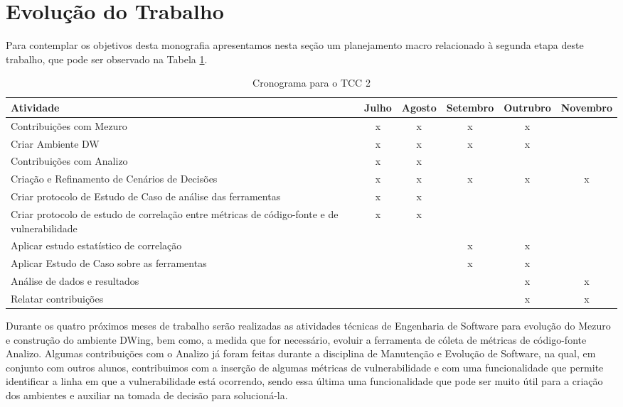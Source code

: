 
\section{Evolução do Trabalho}

%

Para contemplar os objetivos desta monografia apresentamos nesta seção um planejamento macro relacionado à segunda etapa deste trabalho, que pode ser observado na Tabela \ref{tab:cronograma}.

%


	\begin{table}[H]
	\begin{center}
	    \begin{tabular}{ | p{5cm} | c | c |  c |  c |  c |}
	    \hline
	    Atividade & Julho & Agosto & Setembro & Outrubro & Novembro \\ \hline
	    Contribuições com Mezuro & x & x & x & x &  \\ \hline
	    Criar Ambiente DW & x & x & x & x & \\ \hline
	    Contribuições com Analizo & x & x &  &  & \\ \hline
	    Criação e Refinamento de Cenários de Decisões & x & x & x & x & x\\ \hline
	    Criar protocolo de Estudo de Caso de análise das ferramentas & x & x &  &  & \\ \hline
	    Criar protocolo de estudo de correlação entre métricas de código-fonte e de vulnerabilidade & x & x &  &  & \\ \hline
	    Aplicar estudo estatístico de correlação &  &  & x & x & \\ \hline
	    Aplicar Estudo de Caso sobre as ferramentas &  &  & x & x & \\ \hline
	    Análise de dados e resultados &  &  &  & x & x\\ \hline
	    Relatar contribuições &  &  &  & x & x\\ \hline
	    \end{tabular}
	    \caption{Cronograma para o TCC 2}
	    \label{tab:cronograma}
	\end{center}
	\end{table}

Durante os quatro próximos meses de trabalho serão realizadas as atividades técnicas de Engenharia de Software para evolução do Mezuro e construção do ambiente DWing, bem como, a medida que for necessário, evoluir a ferramenta de cóleta de métricas de código-fonte Analizo. Algumas contribuições com o Analizo já foram feitas durante a disciplina de Manutenção e Evolução de Software, na qual, em conjunto com outros alunos, contribuimos com a inserção de algumas métricas de vulnerabilidade e com uma funcionalidade que permite identificar a linha em que a vulnerabilidade está ocorrendo, sendo essa última uma funcionalidade que pode ser muito útil para a criação dos ambientes e auxiliar na tomada de decisão para solucioná-la.

